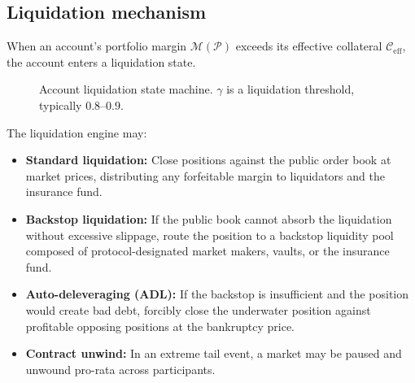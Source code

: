 \documentclass[11pt,a4paper]{article}
\begin{document}
\subsection{Liquidation mechanism}

When an account's portfolio margin $\mathcal{M}(\mathcal{P})$ exceeds its effective collateral $\mathcal{C}_{\text{eff}}$, the account enters a liquidation state.

\begin{figure}[h]
  \centering
  \caption{Account liquidation state machine. $\gamma$ is a liquidation threshold, typically $0.8$--$0.9$.}
  \label{fig:liquidation}
\end{figure}

The liquidation engine may:
\begin{itemize}
  \item \textbf{Standard liquidation:} Close positions against the public order book at market prices, distributing any forfeitable margin to liquidators and the insurance fund.
  \item \textbf{Backstop liquidation:} If the public book cannot absorb the liquidation without excessive slippage, route the position to a backstop liquidity pool composed of protocol-designated market makers, vaults, or the insurance fund.
  \item \textbf{Auto-deleveraging (ADL):} If the backstop is insufficient and the position would create bad debt, forcibly close the underwater position against profitable opposing positions at the bankruptcy price.
  \item \textbf{Contract unwind:} In an extreme tail event, a market may be paused and unwound pro-rata across participants.
\end{itemize}
\end{document}
